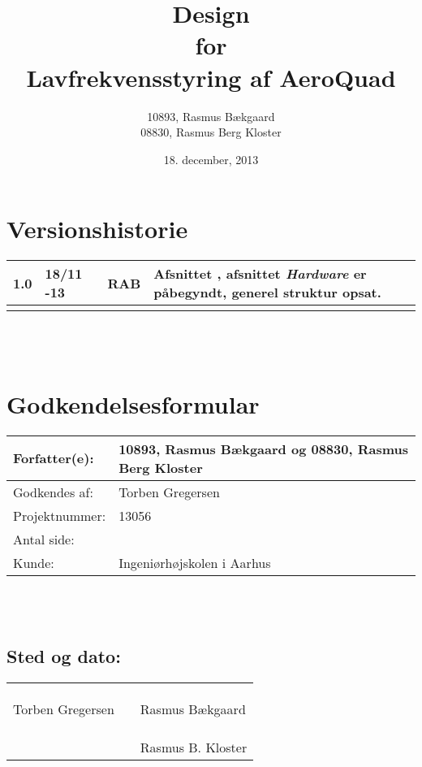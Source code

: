 \documentclass[twoside, 12pt]{memoir}
\title{Design \\ for \\ Lavfrekvensstyring af AeroQuad}
\date{18. december, 2013}
\author{10893, Rasmus Bækgaard\\08830, Rasmus Berg Kloster}
\begin{document}
\begin{titlingpage}
  \maketitle
\end{titlingpage}


\section*{Versionshistorie}
\begin{tabular}{p{}|p{}|p{}|p{}}
1.0 & 18/11 -13 & RAB & Afsnittet \textit{},  afsnittet \textit{Hardware} er påbegyndt, generel struktur opsat.\\ 
\hline 
 & & &  \\ 
\end{tabular} 
\\
\\
\section*{Godkendelsesformular}
\begin{tabular}{p{}|p{}}
\hline 
Forfatter(e): & 10893, Rasmus Bækgaard og 08830, Rasmus Berg Kloster\\ 
\hline 
Godkendes af: & Torben Gregersen \\ 
\hline
Projektnummer: & 13056\\
\hline
Antal side: & \pageref{LastPage} \\
\hline 
Kunde: & Ingeniørhøjskolen i Aarhus \\
\hline
\end{tabular} 
\\
\\
\subsection*{Sted og dato:}
\begin{tabular}{p{} p{} p{}}
&& \\
&& \\
\underline{\qquad \qquad \qquad \qquad \qquad} & \qquad \qquad \qquad & \underline{\qquad \qquad \qquad \qquad \qquad}  \\ 
Torben Gregersen & & Rasmus Bækgaard \\ \\\\
&&  \underline{\qquad \qquad \qquad \qquad \qquad}  \\
& & Rasmus B. Kloster
\end{tabular} 





\newpage
\tableofcontents*
\listoffixmes 





\end{document}
